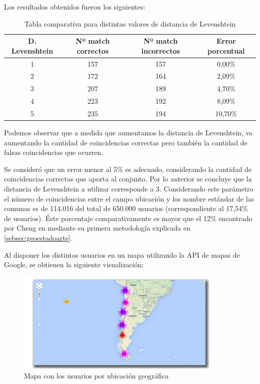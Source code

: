 Los resultados obtenidos fueron los siguientes:

\begin{table}[H]
	\centering
	\begin{tabular}{| c|c|c|c|}
		\hline
		D. Levenshtein & Nº match correctos & Nº match incorrectos  &  Error porcentual \\ \hline
		1   & 157 & 157 & 0,00\% \\ \hline
		2   & 172 & 164 & 2,09\% \\ \hline
		3	& 207 & 189 & 4,70\% \\ \hline
		4	& 223 & 192 & 8,09\% \\ \hline
		5	& 235 & 194 & 10,70\% \\ \hline
	\end{tabular}
	\caption {Tabla comparativa para distintas valores de distancia de Levenshtein}
\end{table}

Podemos observar que a medida que aumentamos la distancia de Levenshtein, va aumentando la cantidad de coincidencias correctas pero también la cantidad de falsas coincidencias que ocurren.

Se consideró que un error menor al 5\% es adecuado, considerando la cantidad de coincidencias correctas que aporta al conjunto. Por lo anterior se concluye que la distancia de Levenshtein a utilizar corresponde a 3. Considerando este parámetro el número de coincidencias entre el campo ubicación y los nombre estándar de las comunas es de 114.016 del total de 650.000 usuarios (correspondiente al 17,54\% de usuarios). Éste porcentaje comparativamente es mayor que el 12\% encontrado por Cheng en \cite{Cheng:2010:YYT:1871437.1871535} mediante su primera metodología explicada en  \ref{sebsec:geoestadoarte}.

Al disponer los distintos usuarios en un mapa utilizando la API de mapas de Google, se obtienen la siguiente visualización:

\begin{figure}[H]
	\centering
	\includegraphics[width=0.9\textwidth]{imgs/mapa_usuarios.png}
	\caption{Mapa con los usuarios por ubicación geográfica}
	\label{fig:mapa_usuarios}
\end{figure}